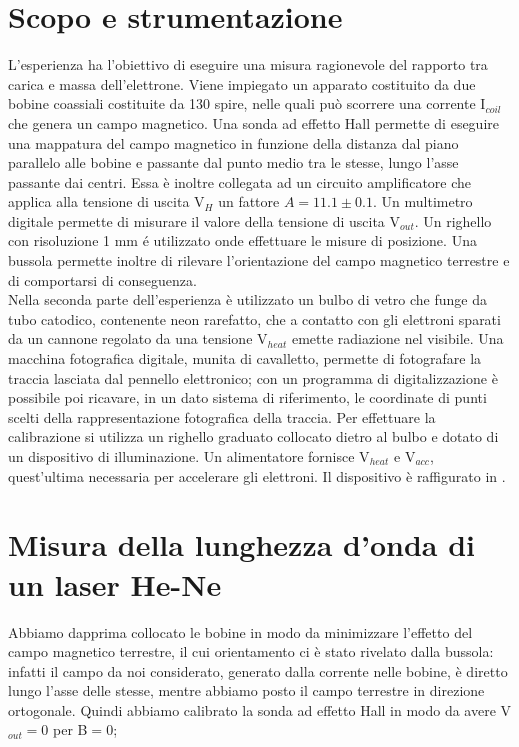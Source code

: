 \section{Scopo e strumentazione}

L'esperienza ha l'obiettivo di eseguire una misura ragionevole del rapporto tra carica e massa dell'elettrone. Viene impiegato un apparato costituito da due bobine coassiali costituite da 130 spire, nelle quali può scorrere una corrente I$_{coil}$ che genera un campo magnetico. Una sonda ad effetto Hall permette di eseguire una mappatura del campo magnetico in funzione della distanza dal piano parallelo alle bobine e passante dal punto medio tra le stesse, lungo l'asse passante dai centri. Essa è inoltre collegata ad un circuito amplificatore che applica alla tensione di uscita V$_H$ un fattore $A = 11.1 \pm 0.1$. Un multimetro digitale permette di misurare il valore della tensione di uscita V$_{out}$. Un righello con risoluzione 1 mm é utilizzato onde effettuare le misure di posizione. Una bussola permette inoltre di rilevare l'orientazione del campo magnetico terrestre e di comportarsi di conseguenza.\\ Nella seconda parte dell'esperienza è utilizzato un bulbo di vetro che funge da tubo catodico, contenente neon rarefatto, che a contatto con gli elettroni sparati da un cannone regolato da una tensione V$_{heat }$ emette radiazione nel visibile. Una macchina fotografica digitale, munita di cavalletto, permette di fotografare la traccia lasciata dal pennello elettronico; con un programma di digitalizzazione è possibile poi ricavare, in un dato sistema di riferimento, le coordinate di punti scelti della rappresentazione fotografica della traccia. Per effettuare la calibrazione si utilizza un righello graduato collocato dietro al bulbo e dotato di un dispositivo di illuminazione. Un alimentatore fornisce V$_{heat}$ e V$_{acc}$, quest'ultima necessaria per accelerare gli elettroni. Il dispositivo è raffigurato in \fig.\\
\section{Misura della lunghezza d'onda di un laser He-Ne}

Abbiamo dapprima collocato le bobine in modo da minimizzare l'effetto del campo magnetico terrestre, il cui orientamento ci è stato rivelato dalla bussola: infatti il campo da noi considerato, generato dalla corrente nelle bobine, è diretto lungo l'asse delle stesse, mentre abbiamo posto il campo terrestre in direzione ortogonale. Quindi abbiamo calibrato la sonda ad effetto Hall in modo da avere V$_{out}=0$ per B$=0$;

